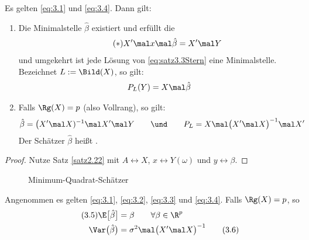 \begin{satz}\label{satz3.3}
	Es gelten \eqref{eq:3.1} und \eqref{eq:3.4}.
	Dann gilt:
	\begin{enumerate}[label=(\arabic*)]
		\item Die Minimalstelle $\hat{\beta}$ existiert und erfüllt die  \label{item:satz3.3(1)}
		\begin{align}\label{eq:satz3.3Stern}\tag{$*$}
			X'\mal x\mal\hat{\beta}=X'\mal Y
		\end{align}
		und umgekehrt ist jede Lösung von \eqref{eq:satz3.3Stern} eine Minimalstelle.\\
		Bezeichnet $L:=\Bild(X)$, so gilt:
		\begin{align*}
			P_L(Y)=X\mal\hat{\beta}
		\end{align*}
		\item Falls $\Rg(X)=p$ (also Vollrang), so gilt:\label{item:satz3.3(2)}
		\begin{align*}
			\hat{\beta}&=\big(X'\mal X)^{-1}\mal X'\mal Y
			\qquad\und\qquad
			P_L=X\mal\big(X'\mal X\big)^{-1}\mal X'
		\end{align*}
		Der Schätzer $\hat{\beta}$ heißt .
	\end{enumerate}
\end{satz}

\begin{proof}
	Nutze Satz \ref{satz2.22} mit $A\leftrightarrow X$, $x\leftrightarrow Y(\omega)$ und $y\leftrightarrow\beta$.
\end{proof}

\begin{figure}[H]
	\begin{center}
		
		\caption{Minimum-Quadrat-Schätzer}
		\label{Abb:MinQuaSchätzer}
	\end{center}
\end{figure}

\begin{satz}\label{satz3.4}
	Angenommen es gelten \eqref{eq:3.1}, \eqref{eq:3.2}, \eqref{eq:3.3} und \eqref{eq:3.4}.
	Falls $\Rg(X)=p$, so
	\begin{align}\label{eq:3.5}\tag{3.5}
		\E\big[\hat{\beta}\big]&=\beta\qquad\forall\beta\in\R^p\\
		\Var\big(\hat{\beta}\big)&=\sigma^2\mal\big(X'\mal X\big)^{-1}\label{eq:3.6}\tag{3.6}
	\end{align}
\end{satz}

